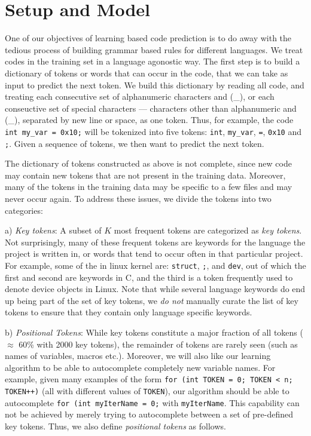 \section{Setup and Model}
\label{sec:model}

\noindent
One of our objectives of learning based code prediction is to do away with the
tedious process of building grammar based rules for different languages.
We treat codes in the training set in a language agonostic way. The first step
is to build a dictionary of tokens or words that can occur in the code, that we
can take as input to predict the next token. We build this dictionary by
reading all code, and treating each consecutive set of alphanumeric characters
and (\_), or each conseuctive set of special characters --- characters other
than alphanumeric and (\_), separated by new line or space, as one token.
Thus, for example, the code {\tt int my\_var = 0x10;} will be tokenized into five
tokens: {\tt int}, {\tt my\_var}, {\tt =}, {\tt 0x10} and {\tt ;}. Given a sequence of
tokens, we then want to predict the next token.

The dictionary of tokens constructed as above is not complete, since new code
may contain new tokens that are not present in the training data. Moreover,
many of the tokens in the training data may be specific to a few files and may
never occur again. To address these issues, we divide the tokens into two
categories:

a) {\it Key tokens}: A subset of $K$ most frequent tokens are categorized as
{\it key tokens}. Not surprisingly, many of
these frequent tokens are keywords for the language the project is written in,
or words that tend to occur often in that
particular project.
For example, some of the in linux kernel are:
\texttt{struct}, \texttt{;}, and \texttt{dev}, out of which the first and second
are keywords in C, and the third is a token frequently used to denote device
objects in Linux. Note that while several language keywords do end up being part
of the set of key tokens, we {\it do not} manually curate the list of key tokens
to ensure that they contain only language specific keywords.

b) {\it Positional Tokens}: While key tokens constitute a major fraction of all
tokens ($\approx$ 60\% with 2000 key tokens), the remainder of tokens are rarely
seen (such as names of variables, macros etc.). Moreover, we will also like our
learning algorithm to be able to autocomplete completely new variable names. For
example, given many examples of the form {\tt for (int TOKEN = 0; TOKEN < n;
TOKEN++)} (all with different values of {\tt TOKEN}), our algorithm should be
able to autocomplete {\tt for (int myIterName = 0;} with {\tt myIterName}. This
capability can not be achieved by merely trying to autocomplete between a set of
pre-defined key tokens. Thus, we also define {\it positional tokens} as follows.

